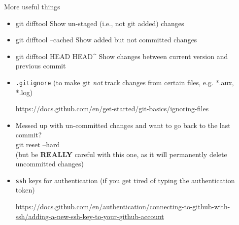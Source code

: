 \documentclass[xcolor={svgnames,x11names,dvipsnames}]{beamer}
\newcommand{\cmd}{}
\begin{document}
\begin{frame}[fragile] {More useful things}
\begin{itemize} 
\item \cmd{git difftool} {\hspace{10pt}\color{mgray} Show un-staged (i.e., not {git add}ed) changes}
\vspace{18pt}
\item \cmd{git difftool --cached} {\hspace{10pt}\color{mgray} Show added but not
committed changes}
\vspace{18pt}
\item \cmd{git difftool HEAD HEAD^} {\hspace{10pt}\color{mgray} Show
changes between current version and previous commit}
\vspace{18pt}

\item {\tt .gitignore} (to make git \emph{not} track changes from certain files, e.g.
*.aux, *.log)

\url{https://docs.github.com/en/get-started/git-basics/ignoring-files}
\vspace{18pt}
\item Messed up with un-committed changes and want to go back to the last
commit?
\\\cmd{git reset --hard}
\\(but be {\bf REALLY} careful with this one, as it will permanently delete uncommitted changes)

\vspace{18pt}
\item {\tt {ssh}} keys for authentication (if you get tired of typing the
authentication token)

\url{https://docs.github.com/en/authentication/connecting-to-github-with-ssh/adding-a-new-ssh-key-to-your-github-account}

\end{itemize}
\end{frame}
\end{document}

